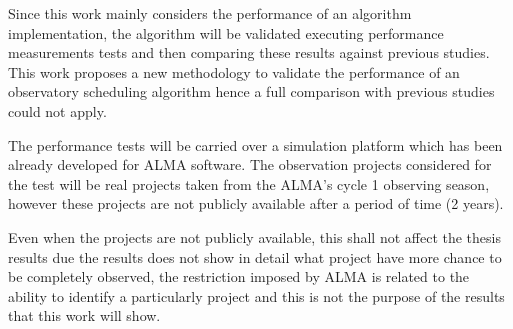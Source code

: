 Since this work mainly considers the performance of an algorithm implementation, the algorithm will be validated
executing performance measurements tests and then comparing these results against previous
studies. This work proposes a new methodology to validate the performance of an observatory
scheduling algorithm hence a full comparison with previous studies could not apply.

The performance tests will be carried over a simulation platform which has been already
developed for ALMA software. The observation projects considered for the test will be real
projects taken from the ALMA’s cycle 1 observing season, however these projects are not publicly
available after a period of time (2 years).

Even when the projects are not publicly available, this shall not affect the thesis results due the
results does not show in detail what project have more chance to be completely observed, the
restriction imposed by ALMA is related to the ability to identify a particularly project and this is
not the purpose of the results that this work will show.
